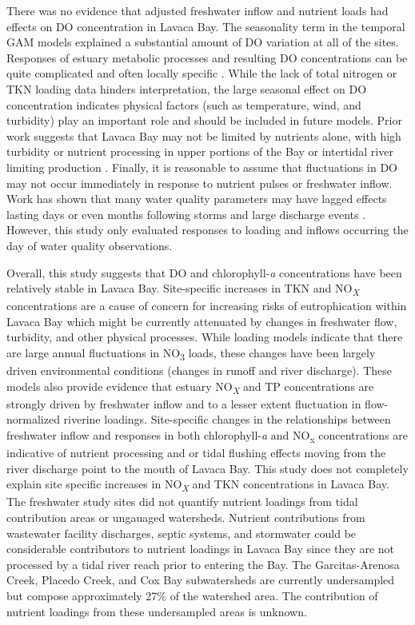 \documentclass[fleqn,10pt,lineno]{wlpeerj} %
\begin{document}
There was no evidence that adjusted freshwater inflow and nutrient loads
had effects on DO concentration in Lavaca Bay. The seasonality term in
the temporal GAM models explained a substantial amount of DO variation
at all of the sites. Responses of estuary metabolic processes and
resulting DO concentrations can be quite complicated and often locally
specific \autocite{caffreyFactorsControllingNet2004}. While the lack of
total nitrogen or TKN loading data hinders interpretation, the large
seasonal effect on DO concentration indicates physical factors (such as
temperature, wind, and turbidity) play an important role and should be
included in future models. Prior work suggests that Lavaca Bay may not
be limited by nutrients alone, with high turbidity or nutrient
processing in upper portions of the Bay or intertidal river limiting
production \autocite{russell_effect_2006}. Finally, it is reasonable to
assume that fluctuations in DO may not occur immediately in response to
nutrient pulses or freshwater inflow. Work has shown that many water
quality parameters may have lagged effects lasting days or even months
following storms and large discharge events
\autocite{mooneyWatershedExportEvents2012a,wetzExtremeFutureEstuaries2013,bukaveckasInfluenceStormEvents2020,walkerTimescalesMagnitudeWater2021}.
However, this study only evaluated responses to loading and inflows
occurring the day of water quality observations.

Overall, this study suggests that DO and chlorophyll-\emph{a}
concentrations have been relatively stable in Lavaca Bay. Site-specific
increases in TKN and NO\textsubscript{\emph{X}} concentrations are a
cause of concern for increasing risks of eutrophication within Lavaca
Bay which might be currently attenuated by changes in freshwater flow,
turbidity, and other physical processes. While loading models indicate
that there are large annual fluctuations in NO\textsubscript{3} loads,
these changes have been largely driven environmental conditions (changes
in runoff and river discharge). These models also provide evidence that
estuary NO\textsubscript{\emph{X}} and TP concentrations are strongly
driven by freshwater inflow and to a lesser extent fluctuation in
flow-normalized riverine loadings. Site-specific changes in the
relationships between freshwater inflow and responses in both
chlorophyll-\emph{a} and NO\textsubscript{x} concentrations are
indicative of nutrient processing and or tidal flushing effects moving
from the river discharge point to the mouth of Lavaca Bay. This study
does not completely explain site specific increases in
NO\textsubscript{\emph{X}} and TKN concentrations in Lavaca Bay. The
freshwater study sites did not quantify nutrient loadings from tidal
contribution areas or ungauaged watersheds. Nutrient contributions from
wastewater facility discharges, septic systems, and stormwater could be
considerable contributors to nutrient loadings in Lavaca Bay since they
are not processed by a tidal river reach prior to entering the Bay. The
Garcitas-Arenosa Creek, Placedo Creek, and Cox Bay subwatersheds are
currently undersampled but compose approximately 27\% of the watershed
area. The contribution of nutrient loadings from these undersampled
areas is unknown.
\end{document}
